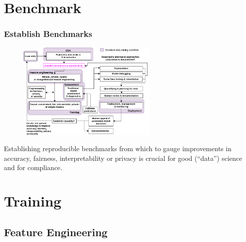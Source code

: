 \documentclass[11pt,
               aspectratio=169,
               hyperref={colorlinks}
               ]{beamer}
\begin{document}
	\section{Benchmark}
	
		\begin{frame}
		
			\frametitle{Establish Benchmarks}		

			\begin{figure}[htb]
				\begin{center}
					\includegraphics[height=135pt]{../img/bench.png}
				\end{center}
			\end{figure}	

			\vspace{-10pt}
			\scriptsize{Establishing reproducible benchmarks from which to gauge improvements in accuracy, fairness, interpretability or privacy is crucial for good (``data'') science and for compliance. }
		
		\end{frame}


	\section{Training}

		\subsection{Feature Engineering}
\end{document}
